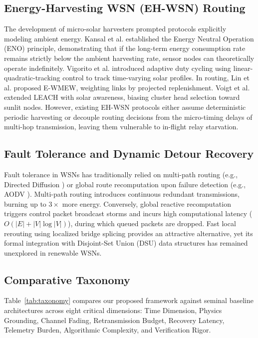 \documentclass[journal]{IEEEtran}
\begin{document}
\subsection{Energy-Harvesting WSN (EH-WSN) Routing}
The development of micro-solar harvesters prompted protocols explicitly modeling ambient energy. Kansal et al. \cite{kansal2007power} established the Energy Neutral Operation (ENO) principle, demonstrating that if the long-term energy consumption rate remains strictly below the ambient harvesting rate, sensor nodes can theoretically operate indefinitely. Vigorito et al. \cite{vigorito2007adaptive} introduced adaptive duty cycling using linear-quadratic-tracking control to track time-varying solar profiles. In routing, Lin et al. \cite{lin2007energy} proposed E-WMEW, weighting links by projected replenishment. Voigt et al. \cite{voigt2003solar} extended LEACH with solar awareness, biasing cluster head selection toward sunlit nodes. However, existing EH-WSN protocols either assume deterministic periodic harvesting or decouple routing decisions from the micro-timing delays of multi-hop transmission, leaving them vulnerable to in-flight relay starvation.

\subsection{Fault Tolerance and Dynamic Detour Recovery}
Fault tolerance in WSNs has traditionally relied on multi-path routing (e.g., Directed Diffusion \cite{intanagonwiwat2003directed}) or global route recomputation upon failure detection (e.g., AODV \cite{perkins2003ad}). Multi-path routing introduces continuous redundant transmissions, burning up to $3\times$ more energy. Conversely, global reactive recomputation triggers control packet broadcast storms and incurs high computational latency ($O(|E| + |V|\log|V|)$), during which queued packets are dropped. Fast local rerouting using localized bridge splicing provides an attractive alternative, yet its formal integration with Disjoint-Set Union (DSU) data structures has remained unexplored in renewable WSNs.

\subsection{Comparative Taxonomy}
Table~\ref{tab:taxonomy} compares our proposed framework against seminal baseline architectures across eight critical dimensions: Time Dimension, Physics Grounding, Channel Fading, Retransmission Budget, Recovery Latency, Telemetry Burden, Algorithmic Complexity, and Verification Rigor.
\end{document}
